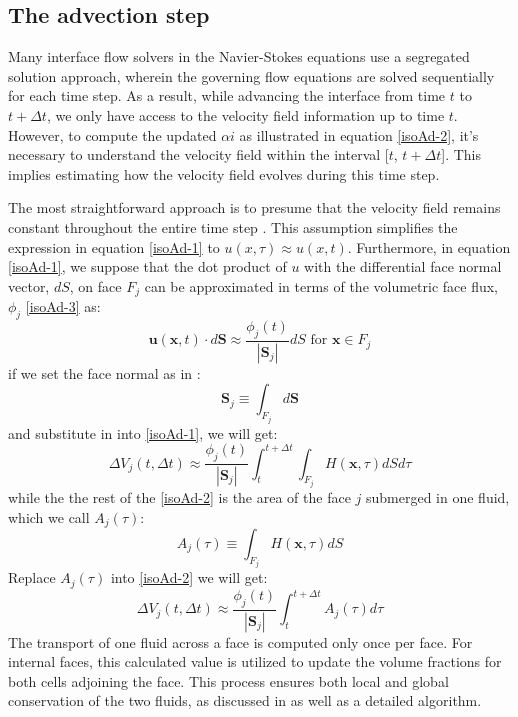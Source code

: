 \subsection{The advection step}
Many interface flow solvers in the Navier-Stokes equations use a segregated solution approach, wherein the governing flow equations are solved sequentially for each time step. As a result, while advancing the interface from time $t$ to $t + \Delta t$, we only have access to the velocity field information up to time $t$. However, to compute the updated $\alpha i$ as illustrated in equation \ref{isoAd-2}, it's necessary to understand the velocity field within the interval [$t$, $t + \Delta t$]. This implies estimating how the velocity field evolves during this time step.

The most straightforward approach is to presume that the velocity field remains constant throughout the entire time step \cite{roenby2019isoadvector}. This assumption simplifies the expression in equation \ref{isoAd-1} to $u(x, \tau) \approx u(x, t)$. Furthermore, in equation \ref{isoAd-1}, we suppose that the dot product of $u$ with the differential face normal vector, $dS$, on face $F_j$ can be approximated in terms of the volumetric face flux, $\phi_j$  \ref{isoAd-3} as:
\begin{equation}
\mathbf{u}(\mathbf{x}, t) \cdot d \mathbf{S} \approx \frac{\phi_{j}(t)}{\left|\mathbf{S}_{j}\right|} d S \text { for } \mathbf{x} \in F_{j}
\end{equation}
if we set the face normal as in \cite{roenby2019isoadvector}:
\begin{equation}
\mathbf{S}_{j} \equiv \int_{F_{j}} d \mathbf{S}
\end{equation}
and substitute in into \ref{isoAd-1}, we will get:
\begin{equation}\label{isoAd-2}
\Delta V_{j}(t, \Delta t) \approx \frac{\phi_{j}(t)}{\left|\mathbf{S}_{j}\right|} \int_{t}^{t+\Delta t} \int_{F_{j}} H(\mathbf{x}, \tau) d S d \tau
\end{equation}
while the the rest of the \ref{isoAd-2} is the area of the face $j$ submerged in one fluid, which we call $A_{j}(\tau)$:
\begin{equation}
A_{j}(\tau) \equiv \int_{F_{j}} H(\mathbf{x}, \tau) d S
\end{equation}
Replace $A_{j}(\tau)$ into \ref{isoAd-2} we will get:
\begin{equation}
\Delta V_{j}(t, \Delta t) \approx \frac{\phi_{j}(t)}{\left|\mathbf{S}_{j}\right|} \int_{t}^{t+\Delta t} A_{j}(\tau) d \tau
\end{equation}
The transport of one fluid across a face is computed only once per face. For internal faces, this calculated value is utilized to update the volume fractions for both cells adjoining the face. This process ensures both local and global conservation of the two fluids, as discussed in \cite{roenby2019isoadvector} as well as a detailed algorithm.


